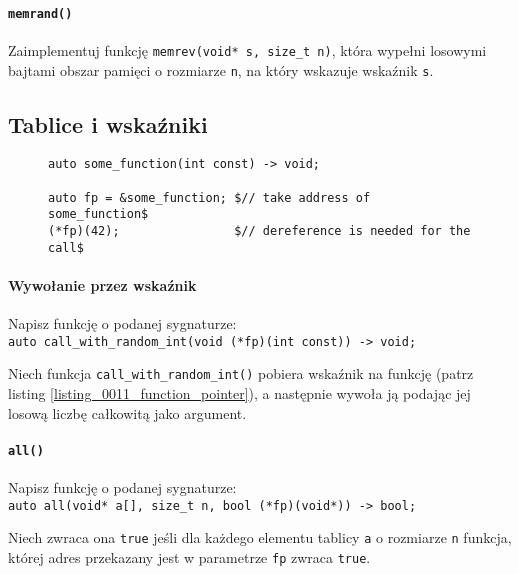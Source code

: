 \documentclass[11pt,a4paper,titlepage,onecolumn]{article}
\begin{document}
\paragraph{\texttt{memrand()}} Zaimplementuj funkcję \texttt{memrev(void* s,
size\_t n)}, która wypełni losowymi bajtami obszar pamięci o rozmiarze
\texttt{n}, na który wskazuje wskaźnik \texttt{s}.

\subsection{Tablice i wskaźniki}

\begin{figure}[!htp]
{\small
\begin{lstlisting}[caption={wskaźnik do funkcji},
    captionpos=b,
    label=listing_0011_function_pointer]
auto some_function(int const) -> void;

auto fp = &some_function; $// take address of some_function$
(*fp)(42);                $// dereference is needed for the call$
\end{lstlisting}}
\end{figure}

\paragraph{Wywołanie przez wskaźnik} Napisz funkcję o podanej sygnaturze:\\
\texttt{auto call\_with\_random\_int(void (*fp)(int const)) -> void;}

Niech funkcja \texttt{call\_with\_random\_int()} pobiera wskaźnik na funkcję
(patrz listing \ref{listing_0011_function_pointer}), a następnie wywoła ją
podając jej losową liczbę całkowitą jako argument.

\paragraph{\texttt{all()}} Napisz funkcję o podanej sygnaturze:\\
\texttt{auto all(void* a[], size\_t n, bool (*fp)(void*)) -> bool;}

Niech zwraca ona \texttt{true} jeśli dla każdego elementu tablicy \texttt{a} o
rozmiarze \texttt{n} funkcja, której adres przekazany jest w parametrze
\texttt{fp} zwraca \texttt{true}.
\end{document}
